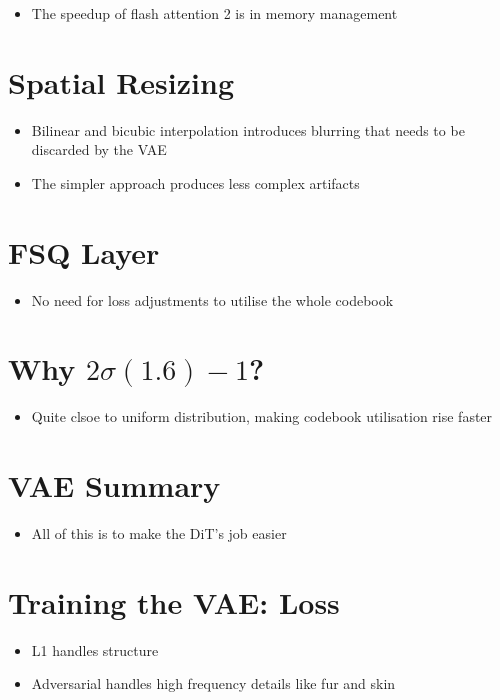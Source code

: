 \documentclass{article}
\begin{document}
\begin{itemize}
    \item The speedup of flash attention 2 is in memory management
\end{itemize}

\section*{Spatial Resizing}

\begin{itemize}
    \item Bilinear and bicubic interpolation introduces blurring that needs to be discarded by the VAE
    \item The simpler approach produces less complex artifacts
\end{itemize}

\section*{FSQ Layer}

\begin{itemize}
    \item No need for loss adjustments to utilise the whole codebook
\end{itemize}

\section*{Why $2\sigma(1.6)-1$?}

\begin{itemize}
    \item Quite clsoe to uniform distribution, making codebook utilisation rise faster
\end{itemize}

\section*{VAE Summary}

\begin{itemize}
    \item All of this is to make the DiT's job easier
\end{itemize}

\section*{Training the VAE: Loss}

\begin{itemize}
    \item L1 handles structure
    \item Adversarial handles high frequency details like fur and skin
\end{itemize}
\end{document}
